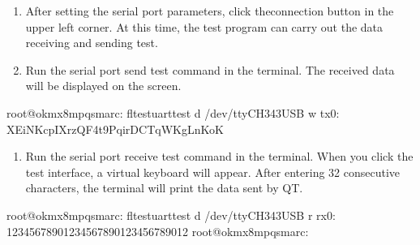 \documentclass[letterpaper,10pt,openany,english]{sphinxmanual}
\begin{document}
\sphinxAtStartPar
{}
\begin{enumerate}
%
\setcounter{enumi}{1}
\item {} 
\sphinxAtStartPar
After setting the serial port parameters, click theconnection button in the upper left corner. At this time, the test program can carry out the data receiving and sending test.

\item {} 
\sphinxAtStartPar
Run the serial port send test command in the terminal. The received data will be displayed on the screen.

\end{enumerate}

\begin{sphinxVerbatim}[commandchars=\\\{\}]
root@ok\PYGZhy{}mx8mpq\PYGZhy{}smarc:\PYGZti{}\PYGZsh{} fltest\PYGZus{}uarttest \PYGZhy{}d /dev/ttyCH343USB  \PYGZhy{}w 
tx\PYGZus{}0: XEiNKcpIXrzQF4t9PqirDCTqWKgLnKoK
\end{sphinxVerbatim}

\sphinxAtStartPar
{}
\begin{enumerate}
%
\setcounter{enumi}{3}
\item {} 
\sphinxAtStartPar
Run the serial port receive test command in the terminal. When you click the test interface, a virtual keyboard will appear. After entering 32 consecutive characters, the terminal will print the data sent by QT.

\end{enumerate}

\begin{sphinxVerbatim}[commandchars=\\\{\}]
root@ok\PYGZhy{}mx8mpq\PYGZhy{}smarc:\PYGZti{}\PYGZsh{} fltest\PYGZus{}uarttest \PYGZhy{}d /dev/ttyCH343USB  \PYGZhy{}r
rx\PYGZus{}0: 12345678901234567890123456789012
root@ok\PYGZhy{}mx8mpq\PYGZhy{}smarc:\PYGZti{}\PYGZsh{}
\end{sphinxVerbatim}

\sphinxAtStartPar
{}
\end{document}

